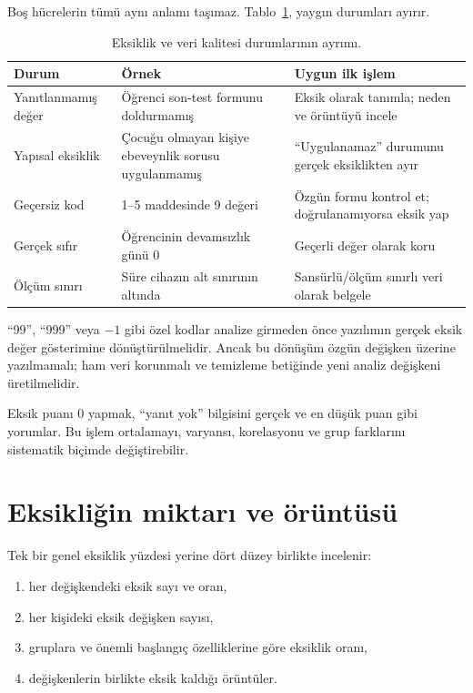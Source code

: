 Boş hücrelerin tümü aynı anlamı taşımaz. Tablo~\ref{tab:missing-types}, yaygın
durumları ayırır.

\begin{table}[htbp]
\centering
\caption{Eksiklik ve veri kalitesi durumlarının ayrımı.}
\label{tab:missing-types}
\begin{tabular}{@{}p{}p{}p{}@{}}
\toprule
Durum & Örnek & Uygun ilk işlem \\
\midrule
Yanıtlanmamış değer & Öğrenci son-test formunu doldurmamış & Eksik olarak tanımla; neden ve örüntüyü incele \\
Yapısal eksiklik & Çocuğu olmayan kişiye ebeveynlik sorusu uygulanmamış & ``Uygulanamaz'' durumunu gerçek eksiklikten ayır \\
Geçersiz kod & 1--5 maddesinde 9 değeri & Özgün formu kontrol et; doğrulanamıyorsa eksik yap \\
Gerçek sıfır & Öğrencinin devamsızlık günü 0 & Geçerli değer olarak koru \\
Ölçüm sınırı & Süre cihazın alt sınırının altında & Sansürlü/ölçüm sınırlı veri olarak belgele \\
\bottomrule
\end{tabular}
\end{table}

``99'', ``999'' veya $-1$ gibi özel kodlar analize girmeden önce yazılımın
gerçek eksik değer gösterimine dönüştürülmelidir. Ancak bu dönüşüm özgün
değişken üzerine yazılmamalı; ham veri korunmalı ve temizleme betiğinde yeni
analiz değişkeni üretilmelidir.

\begin{mistakebox}
Eksik puanı 0 yapmak, ``yanıt yok'' bilgisini gerçek ve en düşük puan gibi
yorumlar. Bu işlem ortalamayı, varyansı, korelasyonu ve grup farklarını
sistematik biçimde değiştirebilir.
\end{mistakebox}

\section{Eksikliğin miktarı ve örüntüsü}

Tek bir genel eksiklik yüzdesi yerine dört düzey birlikte incelenir:

\begin{enumerate}
  \item her değişkendeki eksik sayı ve oran,
  \item her kişideki eksik değişken sayısı,
  \item gruplara ve önemli başlangıç özelliklerine göre eksiklik oranı,
  \item değişkenlerin birlikte eksik kaldığı örüntüler.
\end{enumerate}


